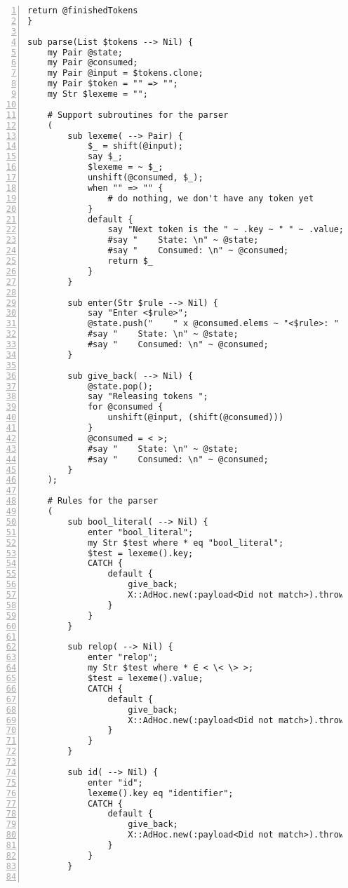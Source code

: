 \documentclass[17pt,english]{extarticle}
\begin{document}
\begin{lstlisting}[numbers=left,basicstyle={\scriptsize\ttfamily},extendedchars=true]
    return @finishedTokens
}

sub parse(List $tokens --> Nil) {
    my Pair @state;
    my Pair @consumed;
    my Pair @input = $tokens.clone;
    my Pair $token = "" => "";
    my Str $lexeme = "";

    # Support subroutines for the parser
    (
        sub lexeme( --> Pair) {
            $_ = shift(@input);
            say $_;
            $lexeme = ~ $_;
            unshift(@consumed, $_);
            when "" => "" {
                # do nothing, we don't have any token yet
            }
            default {
                say "Next token is the " ~ .key ~ " " ~ .value;
                #say "    State: \n" ~ @state;
                #say "    Consumed: \n" ~ @consumed;
                return $_
            }
        }

        sub enter(Str $rule --> Nil) {
            say "Enter <$rule>";
            @state.push("    " x @consumed.elems ~ "<$rule>: " => "Lexeme: \{ $lexeme \}\n");
            #say "    State: \n" ~ @state;
            #say "    Consumed: \n" ~ @consumed;
        }

        sub give_back( --> Nil) {
            @state.pop();
            say "Releasing tokens ";
            for @consumed {
                unshift(@input, (shift(@consumed)))
            }
            @consumed = < >;
            #say "    State: \n" ~ @state;
            #say "    Consumed: \n" ~ @consumed;
        }
    );

    # Rules for the parser
    (
        sub bool_literal( --> Nil) {
            enter "bool_literal";
            my Str $test where * eq "bool_literal";
            $test = lexeme().key;
            CATCH {
                default {
                    give_back;
                    X::AdHoc.new(:payload<Did not match>).throw
                }
            }
        }

        sub relop( --> Nil) {
            enter "relop";
            my Str $test where * ∈ < \< \> >;
            $test = lexeme().value;
            CATCH {
                default {
                    give_back;
                    X::AdHoc.new(:payload<Did not match>).throw
                }
            }
        }

        sub id( --> Nil) {
            enter "id";
            lexeme().key eq "identifier";
            CATCH {
                default {
                    give_back;
                    X::AdHoc.new(:payload<Did not match>).throw
                }
            }
        }


\end{lstlisting}
\end{document}
